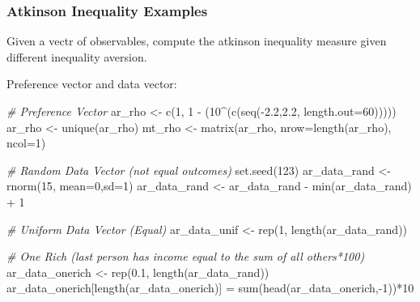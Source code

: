 \documentclass[
]{book}
\newenvironment{Shaded}{\begin{snugshade}}{\end{snugshade}}
\newcommand{\AttributeTok}[1]{\textcolor[rgb]{0.77,0.63,0.00}{#1}}
\newcommand{\CommentTok}[1]{\textcolor[rgb]{0.56,0.35,0.01}{\textit{#1}}}
\newcommand{\DecValTok}[1]{\textcolor[rgb]{0.00,0.00,0.81}{#1}}
\newcommand{\FloatTok}[1]{\textcolor[rgb]{0.00,0.00,0.81}{#1}}
\newcommand{\FunctionTok}[1]{\textcolor[rgb]{0.00,0.00,0.00}{#1}}
\newcommand{\NormalTok}[1]{#1}
\newcommand{\OtherTok}[1]{\textcolor[rgb]{0.56,0.35,0.01}{#1}}
\newcommand{\SpecialCharTok}[1]{\textcolor[rgb]{0.00,0.00,0.00}{#1}}
\begin{document}
\hypertarget{atkinson-inequality-examples}{%
\subsubsection{Atkinson Inequality Examples}\label{atkinson-inequality-examples}}

Given a vectr of observables, compute the atkinson inequality measure given different inequality aversion.

Preference vector and data vector:

\begin{Shaded}
\begin{Highlighting}[]
\CommentTok{\# Preference Vector}
\NormalTok{ar\_rho }\OtherTok{\textless{}{-}} \FunctionTok{c}\NormalTok{(}\DecValTok{1}\NormalTok{, }\DecValTok{1} \SpecialCharTok{{-}}\NormalTok{ (}\DecValTok{10}\SpecialCharTok{\^{}}\NormalTok{(}\FunctionTok{c}\NormalTok{(}\FunctionTok{seq}\NormalTok{(}\SpecialCharTok{{-}}\FloatTok{2.2}\NormalTok{,}\FloatTok{2.2}\NormalTok{, }\AttributeTok{length.out=}\DecValTok{60}\NormalTok{)))))}
\NormalTok{ar\_rho }\OtherTok{\textless{}{-}} \FunctionTok{unique}\NormalTok{(ar\_rho)}
\NormalTok{mt\_rho }\OtherTok{\textless{}{-}} \FunctionTok{matrix}\NormalTok{(ar\_rho, }\AttributeTok{nrow=}\FunctionTok{length}\NormalTok{(ar\_rho), }\AttributeTok{ncol=}\DecValTok{1}\NormalTok{)}

\CommentTok{\# Random Data Vector (not equal outcomes)}
\FunctionTok{set.seed}\NormalTok{(}\DecValTok{123}\NormalTok{)}
\NormalTok{ar\_data\_rand }\OtherTok{\textless{}{-}} \FunctionTok{rnorm}\NormalTok{(}\DecValTok{15}\NormalTok{, }\AttributeTok{mean=}\DecValTok{0}\NormalTok{,}\AttributeTok{sd=}\DecValTok{1}\NormalTok{)}
\NormalTok{ar\_data\_rand }\OtherTok{\textless{}{-}}\NormalTok{ ar\_data\_rand }\SpecialCharTok{{-}} \FunctionTok{min}\NormalTok{(ar\_data\_rand) }\SpecialCharTok{+} \DecValTok{1}

\CommentTok{\# Uniform Data Vector (Equal)}
\NormalTok{ar\_data\_unif }\OtherTok{\textless{}{-}} \FunctionTok{rep}\NormalTok{(}\DecValTok{1}\NormalTok{, }\FunctionTok{length}\NormalTok{(ar\_data\_rand))}

\CommentTok{\# One Rich (last person has income equal to the sum of all others*100)}
\NormalTok{ar\_data\_onerich }\OtherTok{\textless{}{-}} \FunctionTok{rep}\NormalTok{(}\FloatTok{0.1}\NormalTok{, }\FunctionTok{length}\NormalTok{(ar\_data\_rand))}
\NormalTok{ar\_data\_onerich[}\FunctionTok{length}\NormalTok{(ar\_data\_onerich)] }\OtherTok{=} \FunctionTok{sum}\NormalTok{(}\FunctionTok{head}\NormalTok{(ar\_data\_onerich,}\SpecialCharTok{{-}}\DecValTok{1}\NormalTok{))}\SpecialCharTok{*}\DecValTok{10}
\end{Highlighting}
\end{Shaded}
\end{document}
